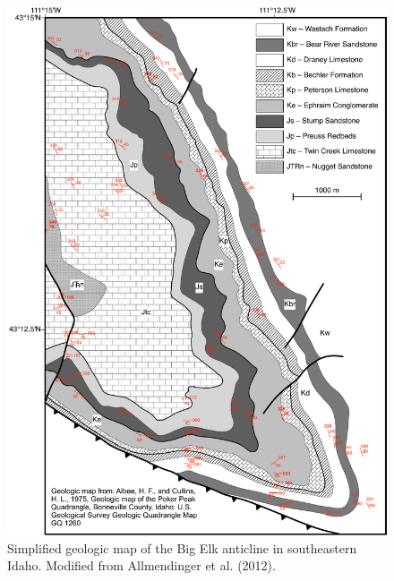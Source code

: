 \documentclass[a4paper , 12pt]{book}
\begin{document}
\begin{figure}
    \centering
    \includegraphics[width=13cm]{ch5f8.pdf}
    \caption{Simplified geologic map of the Big Elk anticline in southeastern Idaho. Modified from Allmendinger et al. (2012).}
    \label{fig:bigElkAnticline}
\end{figure}
\end{document}
